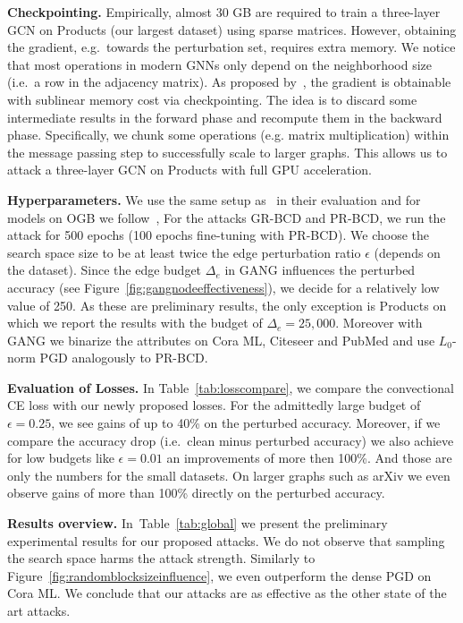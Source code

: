 \documentclass[sigconf,authordraft]{acmart}
\begin{document}
\textbf{Checkpointing.} Empirically, almost 30 GB are required to train a three-layer GCN on Products (our largest dataset) using sparse matrices. However, obtaining the gradient, e.g.\ towards the perturbation set, requires extra memory. We notice that most operations in modern GNNs only depend on the neighborhood size (i.e.~a row in the adjacency matrix). As proposed by~\citet{Chen2016}, the gradient is obtainable with sublinear memory cost via checkpointing. The idea is to discard some intermediate results in the forward phase and recompute them in the backward phase. Specifically, we chunk some operations (e.g. matrix multiplication) within the message passing step to successfully scale to larger graphs. This allows us to attack a three-layer GCN on Products with full GPU acceleration.

\textbf{Hyperparameters.} We use the same setup as~\citet{Geisler2020} in their evaluation and for models on OGB we follow~\citet{Hu2020}, For the attacks GR-BCD and PR-BCD, we run the attack for 500 epochs (100 epochs fine-tuning with PR-BCD). We choose the search space size to be at least twice the edge perturbation ratio \(\epsilon\) (depends on the dataset). Since the edge budget \(\Delta_e\) in GANG influences the perturbed accuracy (see Figure~\ref{fig:gangnodeeffectiveness}), we decide for a relatively low value of 250. As these are preliminary results, the only exception is Products on which we report the results with the budget of \(\Delta_e=25,000\). Moreover with GANG we binarize the attributes on Cora ML, Citeseer and PubMed and use \(L_0\)-norm PGD analogously to PR-BCD.

\textbf{Evaluation of Losses.} In Table~\ref{tab:losscompare}, we compare the convectional CE loss with our newly proposed losses. For the admittedly large budget of \(\epsilon=0.25\), we see gains of up to 40\% on the perturbed accuracy. Moreover, if we compare the accuracy drop (i.e.\ clean minus perturbed accuracy) we also achieve for low budgets like \(\epsilon=0.01\) an improvements of more then 100\%. And those are only the numbers for the small datasets. On larger graphs such as arXiv we even observe gains of more than 100\% directly on the perturbed accuracy.

\textbf{Results overview.} In~Table~\ref{tab:global} we present the preliminary experimental results for our proposed attacks. We do not observe that sampling the search space harms the attack strength. Similarly to Figure~\ref{fig:randomblocksizeinfluence}, we even outperform the dense PGD on Cora ML. We conclude that our attacks are as effective as the other state of the art attacks.
\end{document}
